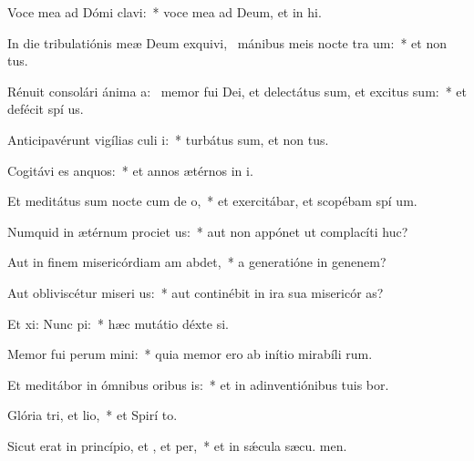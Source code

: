 \item Voce mea ad Dómi clavi:~* voce mea ad Deum, et in hi.
\item In die tribulatiónis meæ Deum exquivi,~\pscross{} mánibus meis nocte tra um:~* et non  tus.
\item Rénuit consolári ánima a:~\pscross{} memor fui Dei, et delectátus sum, et excitus sum:~* et defécit spí us.
\item Anticipavérunt vigílias culi i:~* turbátus sum, et non  tus.
\item Cogitávi es anquos:~* et annos ætérnos in  i.
\item Et meditátus sum nocte cum de o,~* et exercitábar, et scopébam spí um.
\item Numquid in ætérnum prociet us:~* aut non appónet ut complacíti  huc?
\item Aut in finem misericórdiam am abdet,~* a generatióne in genenem?
\item Aut obliviscétur miseri us:~* aut continébit in ira sua misericór as?
\item Et xi: Nunc pi:~* hæc mutátio déxte si.
\item Memor fui perum mini:~* quia memor ero ab inítio mirabíli rum.
\item Et meditábor in ómnibus oribus is:~* et in adinventiónibus tuis bor.
\item Glória tri, et lio,~* et Spirí to.
\item Sicut erat in princípio, et , et per,~* et in sǽcula sæcu. men.
